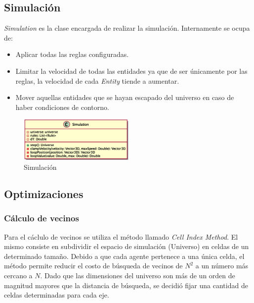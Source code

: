 \documentclass[a4paper]{article}
\begin{document}
        \subsection{Simulación}

            \textit{Simulation} es la clase encargada de realizar la simulación.
            Internamente se ocupa de:
            \begin{itemize}
                \item Aplicar todas las reglas configuradas.
                \item Limitar la velocidad de todas las entidades ya que de ser únicamente por las reglas, la velocidad de cada \textit{Entity} tiende a aumentar.
                \item Mover aquellas entidades que se hayan escapado del universo en caso de haber condiciones de contorno.
            \end{itemize}

            \begin{figure}[H]
                \centering
                \includegraphics[width=0.5\textwidth]{../imgs/simulation}
                \caption{Simulación}
                \label{fig:simulation_implementation}
            \end{figure}

        \subsection{Optimizaciones}
            \subsubsection{Cálculo de vecinos}
                Para el cáclulo de vecinos se utiliza el método llamado \textit{Cell Index Method}. El mismo consiste en subdividir el espacio de simulación (Universo) en celdas de un determinado tamaño. Debido a que cada agente pertenece a una única celda, el método permite reducir el costo de búsqueda de vecinos de $N^2$ a un número más cercano a $N$. Dado que las dimensiones del universo son más de un orden de magnitud mayores que la distancia de búsqueda, se decidió fijar una cantidad de celdas determinadas para cada eje.
\end{document}

